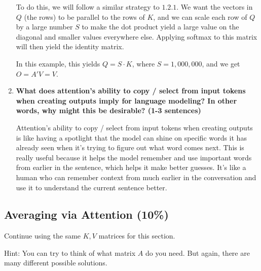 \documentclass{article}
\begin{document}
\begin{enumerate}
    To do this, we will follow a similar strategy to $1.2.1$. We want the
    vectors in $Q$ (the rows) to be parallel to the rows of $K$, and we can
    scale each row of $Q$ by a large number $S$ to make the dot product yield a
    large value on the diagonal and smaller values everywhere else. Applying
    softmax to this matrix will then yield the identity matrix.

    In this example, this yields $\boxed{Q = S \cdot K}$, where $S = 1,000,000$,
    and we get $O = A' V = V$.

    \item \textbf{What does attention's ability to copy / select from input
    tokens when creating outputs imply for language modeling? In other words,
    why might this be desirable? (1-3 sentences)}

    Attention's ability to copy / select from input tokens when creating outputs
    is like having a spotlight that the model can shine on specific words it has
    already seen when it's trying to figure out what word comes next. This is
    really useful because it helps the model remember and use important words
    from earlier in the sentence, which helps it make better guesses. It's like
    a human who can remember context from much earlier in the conversation and
    use it to understand the current sentence better.

\end{enumerate}

\subsection{Averaging via Attention (10\%)}

Continue using the same $K, V$ matrices for this section.

Hint: You can try to think of what matrix $A$ do you need. But again, there are
many different possible solutions.
\end{document}
